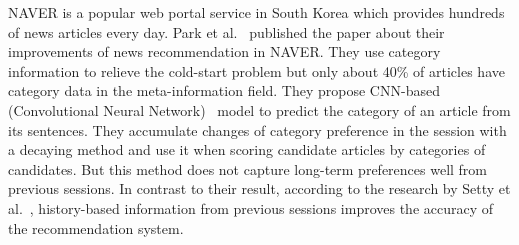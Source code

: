 NAVER is a popular web portal service in South Korea which provides hundreds of news articles every day.
Park et al.~\cite{Naver2017} published the paper about their improvements of news recommendation in NAVER.
They use category information to relieve the cold-start problem but only about 40\% of articles have category data in the meta-information field.
They propose CNN-based (Convolutional Neural Network)~\cite{CNNHinton} model to predict the category of an article from its sentences.
They accumulate changes of category preference in the session with a decaying method and use it when scoring candidate articles by categories of candidates.
But this method does not capture long-term preferences well from previous sessions.
In contrast to their result, according to the research by Setty et al.~\cite{SettyHistory}, history-based information from previous sessions improves the accuracy of the recommendation system.


%
%
